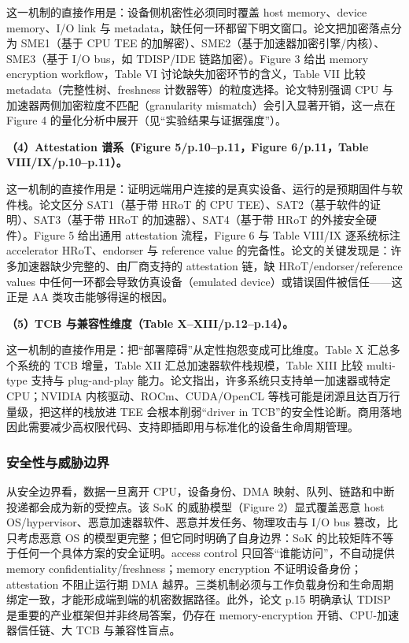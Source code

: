 \documentclass[11pt]{ctexart}
\begin{document}
这一机制的直接作用是：设备侧机密性必须同时覆盖 host memory、device memory、I/O link 与 metadata，缺任何一环都留下明文窗口。论文把加密落点分为 SME1（基于 CPU TEE 的加解密）、SME2（基于加速器加密引擎/内核）、SME3（基于 I/O bus，如 TDISP/IDE 链路加密）。Figure 3 给出 memory encryption workflow，Table VI 讨论缺失加密环节的含义，Table VII 比较 metadata（完整性树、freshness 计数器等）的粒度选择。论文特别强调 CPU 与加速器两侧加密粒度不匹配（granularity mismatch）会引入显著开销，这一点在 Figure 4 的量化分析中展开（见``实验结果与证据强度''）。\par
\noindent\textbf{（4）Attestation 谱系（Figure 5/p.10--p.11，Figure 6/p.11，Table VIII/IX/p.10--p.11）。}\par
这一机制的直接作用是：证明远端用户连接的是真实设备、运行的是预期固件与软件栈。论文区分 SAT1（基于带 HRoT 的 CPU TEE）、SAT2（基于软件的证明）、SAT3（基于带 HRoT 的加速器）、SAT4（基于带 HRoT 的外接安全硬件）。Figure 5 给出通用 attestation 流程，Figure 6 与 Table VIII/IX 逐系统标注 accelerator HRoT、endorser 与 reference value 的完备性。论文的关键发现是：许多加速器缺少完整的、由厂商支持的 attestation 链，缺 HRoT/endorser/reference values 中任何一环都会导致仿真设备（emulated device）或错误固件被信任——这正是 AA 类攻击能够得逞的根因。\par
\noindent\textbf{（5）TCB 与兼容性维度（Table X--XIII/p.12--p.14）。}\par
这一机制的直接作用是：把``部署障碍''从定性抱怨变成可比维度。Table X 汇总多个系统的 TCB 增量，Table XII 汇总加速器软件栈规模，Table XIII 比较 multi-type 支持与 plug-and-play 能力。论文指出，许多系统只支持单一加速器或特定 CPU；NVIDIA 内核驱动、ROCm、CUDA/OpenCL 等栈可能是闭源且达百万行量级，把这样的栈放进 TEE 会根本削弱``driver in TCB''的安全性论断。商用落地因此需要减少高权限代码、支持即插即用与标准化的设备生命周期管理。\par
\subsubsection{安全性与威胁边界}
从安全边界看，数据一旦离开 CPU，设备身份、DMA 映射、队列、链路和中断投递都会成为新的受控点。该 SoK 的威胁模型（Figure 2）显式覆盖恶意 host OS/hypervisor、恶意加速器软件、恶意并发任务、物理攻击与 I/O bus 篡改，比只考虑恶意 OS 的模型更完整；但它同时明确了自身边界：SoK 的比较矩阵不等于任何一个具体方案的安全证明。access control 只回答``谁能访问''，不自动提供 memory confidentiality/freshness；memory encryption 不证明设备身份；attestation 不阻止运行期 DMA 越界。三类机制必须与工作负载身份和生命周期绑定一致，才能形成端到端的机密数据路径。此外，论文 p.15 明确承认 TDISP 是重要的产业框架但并非终局答案，仍存在 memory-encryption 开销、CPU-加速器信任链、大 TCB 与兼容性盲点。\par
\end{document}
